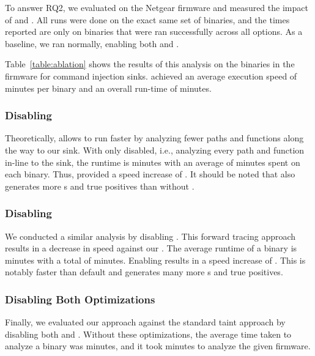 
To answer RQ2, we evaluated \toolname on the Netgear firmware \ablationFirmware and measured the impact of \assumed and \rev.
All runs were done on the exact same set of binaries, and the times reported are only on binaries that were ran successfully across all options.
As a baseline, we ran \toolname normally, enabling both \assumed and \rev.

Table~\ref{table:ablation} shows the results of this analysis on the \ablationSampleBins binaries in the firmware for command injection sinks.
\mango achieved an average execution speed of  minutes per binary and an overall run-time of  minutes.

\subsubsection{Disabling \assumed}

Theoretically, \assumed allows \mango to run faster by analyzing fewer paths and functions along the way to our sink.
With only \assumed disabled, i.e., analyzing every path and function in-line to the sink, the runtime is \assumedTotal minutes with an average of \assumedAverageMin minutes spent on each binary.
Thus, \assumed provided a speed increase of \assumedPercentage.
It should be noted that \assumed also generates more \trupoc{}s and true positives than \mango without \assumed.

\subsubsection{Disabling \rev}

We conducted a similar analysis by disabling \rev.
This forward tracing approach results in a decrease in speed against our \rev.
The average runtime of a binary is \traceAverageMin minutes with a total of \traceTotal minutes.
Enabling \rev results in a speed increase of \tracePercentage.
This is notably faster than default \mango and generates many more \trupoc{}s and true positives.

\subsubsection{Disabling Both Optimizations}
Finally, we evaluated our approach against the standard taint approach by disabling both \assumed and \rev.
Without these optimizations, the average time taken to analyze a binary was \allAverageMin minutes, and it took \allTotal minutes to analyze the given firmware.

